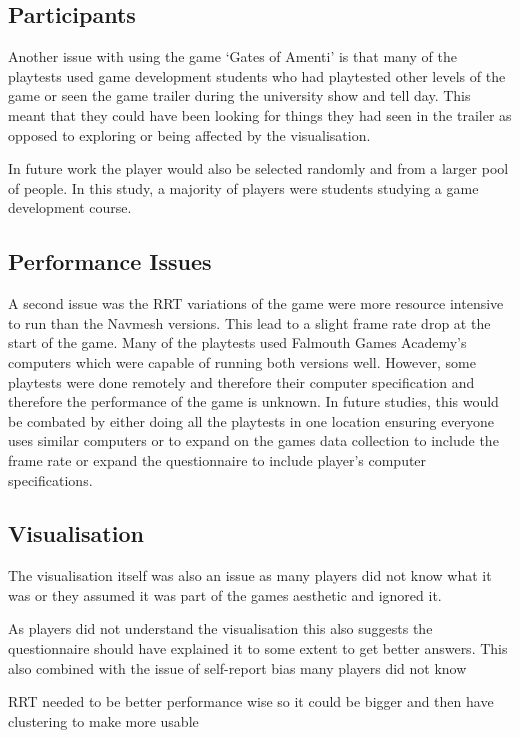 \documentclass[journal]{IEEEtran}
\begin{document}
	\subsection{Participants}
	Another issue with using the game `Gates of Amenti' is that many of the playtests used game development students who had playtested other levels of the game or seen the game trailer during the university show and tell day. This meant that they could have been looking for things they had seen in the trailer as opposed to exploring or being affected by the visualisation.
	
	In future work the player would also be selected randomly and from a larger pool of people. In this study, a majority of players were students studying a game development course.
	
	\subsection{Performance Issues}
	A second issue was the RRT variations of the game were more resource intensive to run than the Navmesh versions. This lead to a slight frame rate drop at the start of the game. 
	Many of the playtests used Falmouth Games Academy's computers which were capable of running both versions well. However, some playtests were done remotely and therefore their computer specification and therefore the performance of the game is unknown. In future studies, this would be combated by either doing all the playtests in one location ensuring everyone uses similar computers or to expand on the games data collection to include the frame rate or expand the questionnaire to include player's computer specifications.     
	
	\subsection{Visualisation}    
	The visualisation itself was also an issue as many players did not know what it was or they assumed it was part of the games aesthetic and ignored it.    
	
	As players did not understand the visualisation this also suggests the questionnaire should have explained it to some extent to get better answers. This also combined with the issue of self-report bias many players did not know  
	
	RRT needed to be better performance wise so it could be bigger and then have clustering to make more usable 
	
\end{document}
